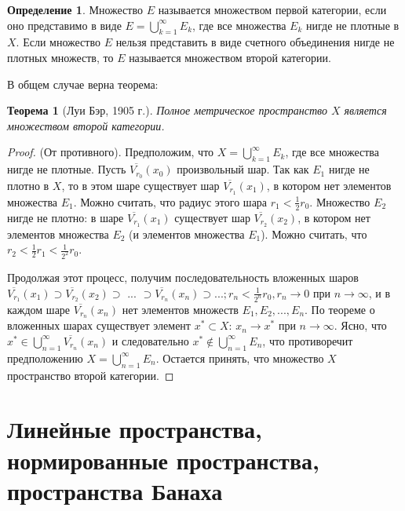 \documentclass[12pt,a4paper,titlepage]{book}
\theoremstyle{definition}
\newtheorem{definition}{Определение}
\theoremstyle{plain}
\newtheorem{theorem}{Теорема}
\theoremstyle{remark}
\theoremstyle{plain}
\begin{document}
\begin{definition}
Множество $E$ называется множеством первой категории, если оно представимо в виде $E=\bigcup\limits_{k=1}^\infty E_k$, где все множества $E_k$ нигде не плотные в $X$. Если множество $E$ нельзя представить в виде счетного объединения нигде не плотных множеств, то $E$ называется множеством второй категории.
\end{definition}
В общем случае верна теорема:
\begin{theorem}[Луи Бэр, 1905 г.]
Полное метрическое пространство $X$ является множеством второй категории.
\end{theorem}
\begin{proof}
(От противного).
Предположим, что $X=\bigcup\limits_{k=1}^\infty E_k$, где все множества нигде не плотные. Пусть $\overline{V_{r_0}}(x_0)$ произвольный шар. Так как $E_1$ нигде не плотно в $X$, то в этом шаре существует шар $\overline{V_{r_1}}(x_1)$, в котором нет элементов множества $E_1$. Можно считать, что радиус этого шара $r_1 < \frac{1}{2}r_0$.
Множество $E_2$ нигде не плотно: в шаре $\overline{V_{r_1}}(x_1)$ существует шар $\overline{V_{r_2}}(x_2)$, в котором нет элементов множества $E_2$ (и элементов множества $E_1$). Можно считать, что $r_2 < \frac{1}{2}r_1 < \frac{1}{2^2}r_0$.

Продолжая этот процесс, получим последовательность вложенных шаров $\overline{V_{r_1}}(x_1) \supset \overline{V_{r_2}}(x_2) \supset$ ... $\supset \overline{V_{r_n}}(x_n) \supset ...; r_n < \frac{1}{2^n}r_0, r_n \rightarrow 0$ при $n \rightarrow \infty$, и в каждом шаре $\overline{V_{r_n}}(x_n)$ нет элементов множеств $E_1, E_2, ..., E_n$.
По теореме о вложенных шарах существует элемент $x^*\subset X$:
$x_n \rightarrow x^*$ при $n \rightarrow \infty$.
\hfill \break
Ясно, что $x^*\in \bigcup\limits_{n=1}^\infty \overline{V_{r_n}}(x_n)$ и следовательно $x^*\notin \bigcup\limits_{n=1}^\infty E_n$, что противоречит предположению $X=\bigcup\limits_{n=1}^\infty E_n$. Остается принять, что множество $X$ пространство второй категории.

\end{proof}

\section{Линейные пространства, нормированные пространства, пространства Банаха}
\end{document}
